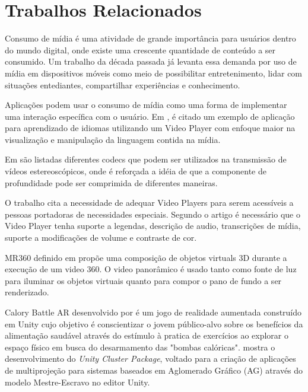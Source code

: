 \section{Trabalhos Relacionados} \label{sec-relatedworks}

Consumo de mídia é uma atividade de grande importância para usuários dentro do mundo digital, onde existe uma crescente quantidade de conteúdo a ser consumido. Um trabalho \cite{repo2004users} da década passada já levanta essa demanda por uso de mídia em dispositivos móveis como meio de possibilitar entretenimento, lidar com situações entediantes, compartilhar experiências e conhecimento.

Aplicações podem usar o consumo de mídia como uma forma de implementar uma interação específica com o usuário. Em \cite{hu2018kalgan}, é citado um exemplo de aplicação para aprendizado de idiomas utilizando um Video Player com enfoque maior na visualização e manipulação da linguagem contida na mídia.

Em \cite{smolic2009overview} são listadas diferentes codecs que podem ser utilizados na transmissão de vídeos estereoscópicos, onde é reforçada a idéia de que a componente de profundidade pode ser comprimida de diferentes maneiras.


O trabalho \cite{wild2018inaccessibility} cita a necessidade de adequar Video Players para serem acessíveis a pessoas portadoras de necessidades especiais. Segundo o artigo é necessário que o Video Player tenha suporte a legendas, descrição de audio, transcrições de mídia, suporte a modificações de volume e contraste de cor.

MR360 definido em \cite{rhee2017mr360} propõe uma composição de objetos virtuals 3D durante a execução de um video 360. O video panorâmico é usado tanto como fonte de luz para iluminar os objetos virtuais quanto para compor o pano de fundo a ser renderizado.

Calory Battle AR desenvolvido por \cite{kim2014using} é um jogo de realidade aumentada construído em Unity cujo objetivo é conscientizar o jovem público-alvo sobre os benefícios da alimentação saudável através do estímulo à pratica de exercícios ao explorar o espaço físico em busca do desarmamento das "bombas calóricas".
\cite{sv2015popolin} mostra o desenvolvimento do \textit{Unity Cluster Package}, voltado para a criação de aplicações de multiprojeção para sistemas baseados em Aglomerado Gráfico (AG) através do modelo Mestre-Escravo no editor Unity.

